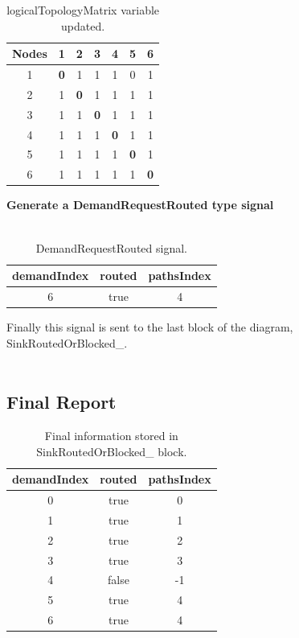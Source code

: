 \begin{table}[H]
	\centering	
	\begin{tabular}{|c|c|c|c|c|c|c|}
		\hline
		\multicolumn{1}{|l|}{\textbf{Nodes}} & 1   & 2   & 3   & 4   & 5   & 6  \\ \hline
		1                           & \textbf{0}   & 1 & 1 & 1 & 0 & 1 \\ \hline
		2                           & 1 & \textbf{0}   & 1 & 1 & 1 & 1 \\ \hline
		3                           & 1 & 1 & \textbf{0}   & 1 & 1 & 1 \\ \hline
		4                           & 1 & 1 & 1 & \textbf{0}   & 1 & 1 \\ \hline
		5                           & 1 & 1 & 1 & 1 & \textbf{0}   & 1 \\ \hline
		6                           & 1 & 1 & 1 & 1 & 1 & \textbf{0}   \\ \hline
	\end{tabular}
	\caption{logicalTopologyMatrix variable updated.}
	\label{Transparentlogical_topology_updated}
\end{table}

\textbf{Generate a DemandRequestRouted type signal}\\ \\

\begin{table}[H]
	\centering
	\begin{tabular}{|c|c|c|}
		\hline
		demandIndex & routed & pathsIndex \\ \hline
		6 & true & 4 \\ \hline
	\end{tabular}
	\caption{DemandRequestRouted signal.}
\end{table}

Finally this signal is sent to the last block of the diagram, SinkRoutedOrBlocked\_.\\ \\

\subsection{Final Report}
\begin{table}[H]
	\centering
	\begin{tabular}{|c|c|c|}
		\hline
		demandIndex & routed & pathsIndex \\ \hline
		0 & true & 0 \\ \hline
		1 & true & 1 \\ \hline
		2 & true & 2 \\ \hline
		3 & true & 3 \\ \hline
		4 & false & -1 \\ \hline
		5 & true & 4 \\ \hline
		6 & true & 4 \\ \hline
	\end{tabular}
	\caption{Final information stored in SinkRoutedOrBlocked\_  block.}
\end{table}

